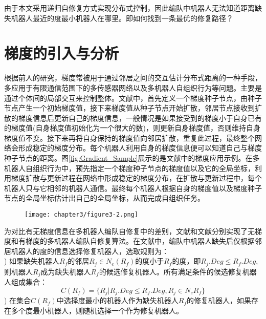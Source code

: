 由于本文采用递归自修复方式实现分布式控制，因此编队中机器人无法知道距离缺失机器人最近的度最小机器人在哪里。即如何找到一条最优的修复路径？

\section{梯度的引入与分析}
根据前人的研究，梯度常被用于通过邻居之间的交互估计分布式距离的一种手段\supercite{SciencePaper,nagpal2003organizing,stoy2006using,rubenstein2012kilobot,meng2011autonomous,terada2008automatic}，多应用于有限通信范围下的多传感器网络\supercite{nagpal2003organizing}以及多机器人自组织行为\supercite{SciencePaper,stoy2006using}等问题。主要是通过个体间的局部交互来控制整体。文献\parencite{SciencePaper,stoy2006using,rubenstein2012kilobot,terada2008automatic}中，首先定义一个梯度种子节点，由种子节点产生一个初始梯度值，接下来梯度值从种子节点开始扩散，邻居节点接收到扩散的梯度信息后更新自己的梯度信息，一般情况是如果接受到的梯度小于自身已有的梯度值(自身梯度值初始化为一个很大的数)，则更新自身梯度值，否则维持自身梯度值不变。接下来再将自身保持的梯度值向邻居扩散，重复此过程，最终整个网络会形成稳定的梯度分布。每个机器人利用自身的梯度信息便可以知道自己与梯度种子节点的距离。图\ref{fig:Gradient_Sample}展示的是文献\parencite{SciencePaper}中的梯度应用示例。在多机器人自组织行为中，预先指定一个梯度种子节点的梯度值以及它的全局坐标，利用梯度扩散与更新过程在网络中形成稳定的梯度分布，在扩散与更新过程中，每个机器人只与它相邻的机器人通信。最终每个机器人根据自身的梯度值以及梯度种子节点的全局坐标估计出自己的全局坐标，从而完成自组织任务。
\begin{figure}[!htbp]
	\centering
	\texttt{[image: chapter3/figure3-2.png]}
\end{figure}

为对比有无梯度信息在多机器人编队自修复中的差别，文献\parencite{张飞2008移动机器人覆盖问题的研究}和文献\parencite{liu2015gradient}分别实现了无梯度和有梯度的多机器人编队自修复算法。在文献\parencite{张飞2008移动机器人覆盖问题的研究}中，编队中机器人缺失后仅根据邻居机器人的度的信息选择修复机器人，选取规则为：\\
) 如果缺失机器人$R_f$的邻居$R_j \in N_e(R_f)$的度小于$R_f$的度，即$R_j.Deg \leq R_f.Deg$,则机器人$R_j$成为缺失机器人$R_f$的候选修复机器人。所有满足条件的候选修复机器人组成集合：\\
\begin{equation}
	C(R_f) = \{ R_j | R_j.Deg \leq R_f.Deg, R_j \in N_e{R_f} \} 
\end{equation} 
) 在集合$C(R_f)$中选择度最小的机器人作为缺失机器人$R_f$的修复机器人，如果存在多个度最小机器人，则随机选择一个作为修复机器人。\\


